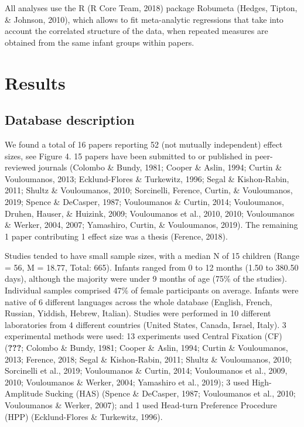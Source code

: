 \documentclass[man]{apa6}
\begin{document}
All analyses use the R (R Core Team, 2018) package Robumeta (Hedges, Tipton, \& Johnson, 2010), which allows to fit meta-analytic regressions that take into account the correlated structure of the data, when repeated measures are obtained from the same infant groups within papers.

\hypertarget{results}{%
\section{Results}\label{results}}

\hypertarget{database-description}{%
\subsection{Database description}\label{database-description}}

We found a total of 16 papers reporting 52 (not mutually independent) effect sizes, see Figure 4. 15 papers have been submitted to or published in peer-reviewed journals (Colombo \& Bundy, 1981; Cooper \& Aslin, 1994; Curtin \& Vouloumanos, 2013; Ecklund-Flores \& Turkewitz, 1996; Segal \& Kishon-Rabin, 2011; Shultz \& Vouloumanos, 2010; Sorcinelli, Ference, Curtin, \& Vouloumanos, 2019; Spence \& DeCasper, 1987; Vouloumanos \& Curtin, 2014; Vouloumanos, Druhen, Hauser, \& Huizink, 2009; Vouloumanos et al., 2010, 2010; Vouloumanos \& Werker, 2004, 2007; Yamashiro, Curtin, \& Vouloumanos, 2019). The remaining 1 paper contributing 1 effect size was a thesis (Ference, 2018).

Studies tended to have small sample sizes, with a median N of 15 children (Range = 56, M = 18.77, Total: 665).
Infants ranged from 0 to 12 months (1.50 to 380.50 days), although the majority were under 9 months of age (75\% of the studies). Individual samples comprised 47\% of female participants on average. Infants were native of 6 different languages across the whole database (English, French, Russian, Yiddish, Hebrew, Italian).
Studies were performed in 10 different laboratories from 4 different countries (United States, Canada, Israel, Italy). 3 experimental methods were used: 13 experiments used Central Fixation (CF) ({\textbf{???}}; Colombo \& Bundy, 1981; Cooper \& Aslin, 1994; Curtin \& Vouloumanos, 2013; Ference, 2018; Segal \& Kishon-Rabin, 2011; Shultz \& Vouloumanos, 2010; Sorcinelli et al., 2019; Vouloumanos \& Curtin, 2014; Vouloumanos et al., 2009, 2010; Vouloumanos \& Werker, 2004; Yamashiro et al., 2019); 3 used High-Amplitude Sucking (HAS) (Spence \& DeCasper, 1987; Vouloumanos et al., 2010; Vouloumanos \& Werker, 2007); and 1 used Head-turn Preference Procedure (HPP) (Ecklund-Flores \& Turkewitz, 1996).
\end{document}
